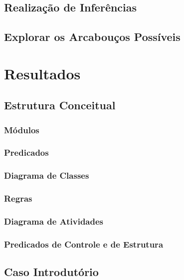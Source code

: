 \documentclass[openright]{normas-utf-tex} %
\begin{document}
    \section{Realização de Inferências}    
        
    \section{Explorar os Arcabouços Possíveis} 
        
\chapter{Resultados}
\label{chap:resul}
	
	\section{Estrutura Conceitual} \label{estconceitual}
		
		\subsection{Módulos} \label{mods}			
			
		\subsection{Predicados}\label{predic}
			
		\subsection{Diagrama de Classes}
			
		\subsection{Regras} \label{regras}
			
		\subsection{Diagrama de Atividades} \label{umldiagram}
			
		\subsection{Predicados de Controle e de Estrutura} \label{cenarios}
			
	\section{Caso Introdutório} \label{introdutorycase}
			
\end{document}
